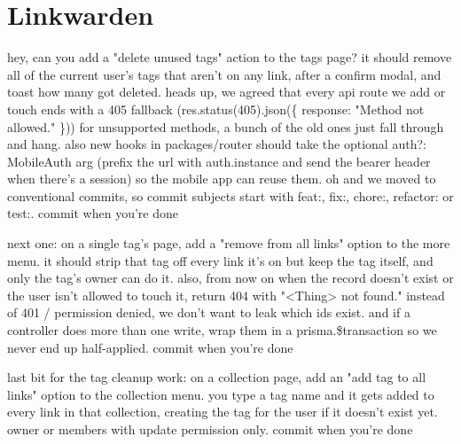 \section{Linkwarden}
\begin{description}[style=nextline, nosep, leftmargin=1.2em]
\item[F1 (5 code, 3 stated checks)] \small hey, can you add a "delete unused tags" action to the tags page? it should remove all of the current user's tags that aren't on any link, after a confirm modal, and toast how many got deleted. heads up, we agreed that every api route we add or touch ends with a 405 fallback (res.status(405).json(\{ response: "Method not allowed." \})) for unsupported methods, a bunch of the old ones just fall through and hang. also new hooks in packages/router should take the optional auth?: MobileAuth arg (prefix the url with auth.instance and send the bearer header when there's a session) so the mobile app can reuse them. oh and we moved to conventional commits, so commit subjects start with feat:, fix:, chore:, refactor: or test:. commit when you're done
\item[F2 (3 code, 2 stated, 3 carried checks)] \small next one: on a single tag's page, add a "remove from all links" option to the more menu. it should strip that tag off every link it's on but keep the tag itself, and only the tag's owner can do it. also, from now on when the record doesn't exist or the user isn't allowed to touch it, return 404 with "<Thing> not found." instead of 401 / permission denied, we don't want to leak which ids exist. and if a controller does more than one write, wrap them in a prisma.\$transaction so we never end up half-applied. commit when you're done
\item[F3 (3 code, 5 carried checks)] \small last bit for the tag cleanup work: on a collection page, add an "add tag to all links" option to the collection menu. you type a tag name and it gets added to every link in that collection, creating the tag for the user if it doesn't exist yet. owner or members with update permission only. commit when you're done
\end{description}
